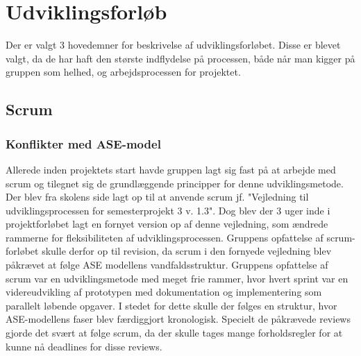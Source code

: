 \section{Udviklingsforløb}
Der er valgt 3 hovedemner for beskrivelse af udviklingsforløbet. Disse er blevet valgt, da de har haft den største indflydelse på processen, 
både når man kigger på gruppen som helhed, og arbejdsprocessen for projektet.  

\subsection{Scrum}
\subsubsection{Konflikter med ASE-model}
Allerede inden projektets start havde gruppen lagt sig fast på at arbejde med scrum og tilegnet sig de grundlæggende principper for denne udviklingsmetode.
Der blev fra skolens side lagt op til at anvende scrum jf. "Vejledning til udviklingsprocessen for semesterprojekt 3 v. 1.3". Dog blev der 3 uger inde
i projektforløbet lagt en fornyet version op af denne vejledning, som ændrede rammerne for fleksibiliteten af udviklingsprocessen. Gruppens opfattelse af 
scrum-forløbet skulle derfor op til revision, da scrum i den fornyede vejledning blev påkrævet at følge ASE modellens vandfaldsstruktur. Gruppens opfattelse
af scrum var en udviklingsmetode med meget frie rammer, hvor hvert sprint var en videreudvikling af prototypen med dokumentation og implementering som 
parallelt løbende opgaver. I stedet for dette skulle der følges en struktur, hvor ASE-modellens faser blev færdiggjort kronologisk. Specielt de påkrævede reviews
gjorde det svært at følge scrum, da der skulle tages mange forholdsregler for at kunne nå deadlines for disse reviews.
 
